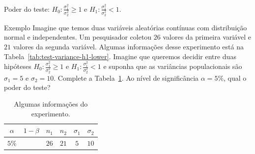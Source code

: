 \documentclass[9pt]{beamer}
\begin{document}
\begin{frame}{Poder do teste: $H_0:\frac{\sigma_1^2}{\sigma_2^2} \geq 1$ e $H_1:\frac{\sigma_1^2}{\sigma_2^2} < 1$.}

\begin{block}{Exemplo}
	Imagine que temos duas variáveis aleatórias contínuas com distribuição normal e independentes. Um pesquisador coletou $26$ valores da primeira variável e $21$ valores da segunda variável. Algumas informações desse experimento está na Tabela~\ref{tab:test-variance-h1-lower}. Imagine que queremos decidir entre duas hipóteses $H_0: \frac{\sigma_1^2}{\sigma_2^2} \geq 1$ e $H_1: \frac{\sigma_1^2}{\sigma_2^2} < 1$ e suponha que as variâncias populacionais são $\sigma_1 = 5$  e $\sigma_2 = 10$. Complete a Tabela~\ref{tab:test-variance-h1-lower-power}. Ao nível de significância $\alpha=5\%$, qual o poder do teste?
	\begin{table}[htbp]
		\centering
		\begin{tabular}{c|c|c|c|c|c}
			\toprule[0.05cm]
			$\alpha$ & $1-\beta$ & $n_1$ & $n_2$ & $\sigma_1$ & $\sigma_2$\\
			\midrule[0.025cm]
			$5\%$ & & $26$ & $21$ & $5$ & $10$ \\
			\bottomrule[0.05cm]
		\end{tabular}
		\caption{Algumas informações do experimento.}
		\label{tab:test-variance-h1-lower-power}
	\end{table}
\end{block}
\end{frame}
\end{document}
